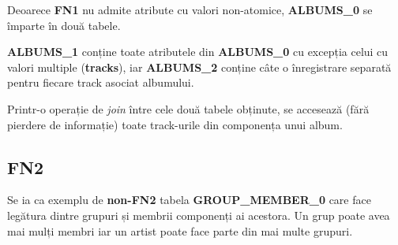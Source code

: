 \documentclass[a4paper, oneside, 12pt]{article}
\newcommand{\rowstyle}[1]{\gdef\currentrowstyle{#1}%
  #1\ignorespaces
}
\begin{document}
Deoarece \textbf{FN1} nu admite atribute cu valori non-atomice,
\textbf{ALBUMS\_0} se împarte în două tabele.

\textbf{ALBUMS\_1} conține
toate atributele din \textbf{ALBUMS\_0} cu excepția celui cu valori multiple (\textbf{tracks}),
iar \textbf{ALBUMS\_2} conține câte o înregistrare separată pentru fiecare
track asociat albumului.

Printr-o operație de \emph{join} între cele două tabele obținute, se accesează
(fără pierdere de informație) toate track-urile din componența unui album.



\begin{table}[h]
\centering
\caption*{Tabela \textbf{ALBUMS\_1}:}
\end{table}

\begin{table}[H]
\centering
\caption*{Tabela \textbf{ALBUMS\_2}:}
\end{table}

\subsection{FN2}

Se ia ca exemplu de \textbf{non-FN2} tabela \textbf{GROUP\_MEMBER\_0} care face
legătura dintre grupuri și membrii componenți ai acestora. Un grup poate avea
mai mulți membri iar un artist poate face parte din mai multe grupuri.
\end{document}

